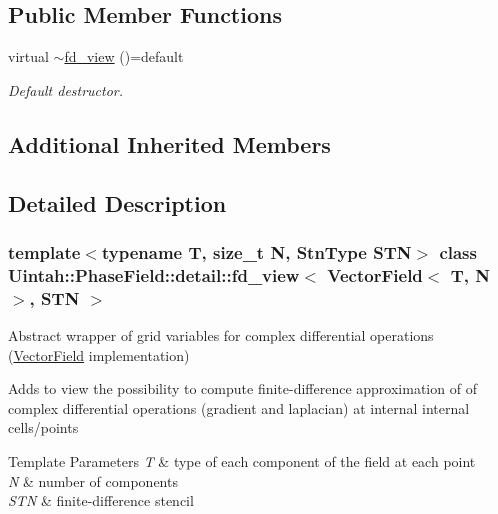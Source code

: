 \subsection*{Public Member Functions}
\begin{DoxyCompactItemize}
\item 
virtual \hyperlink{classUintah_1_1PhaseField_1_1detail_1_1fd__view_3_01VectorField_3_01T_00_01N_01_4_00_01STN_01_4_a7d8e9e947814c68b5cb5d24f08bd6aa5}{$\sim$fd\+\_\+view} ()=default
\begin{DoxyCompactList}\small\item\em Default destructor. \end{DoxyCompactList}\end{DoxyCompactItemize}
\subsection*{Additional Inherited Members}


\subsection{Detailed Description}
\subsubsection*{template$<$typename T, size\+\_\+t N, Stn\+Type S\+TN$>$\newline
class Uintah\+::\+Phase\+Field\+::detail\+::fd\+\_\+view$<$ Vector\+Field$<$ T, N $>$, S\+T\+N $>$}

Abstract wrapper of grid variables for complex differential operations (\hyperlink{structUintah_1_1PhaseField_1_1VectorField}{Vector\+Field} implementation) 

Adds to view the possibility to compute finite-\/difference approximation of of complex differential operations (gradient and laplacian) at internal internal cells/points


\begin{DoxyTemplParams}{Template Parameters}
{\em T} & type of each component of the field at each point \\
\hline
{\em N} & number of components \\
\hline
{\em S\+TN} & finite-\/difference stencil \\
\hline
\end{DoxyTemplParams}


